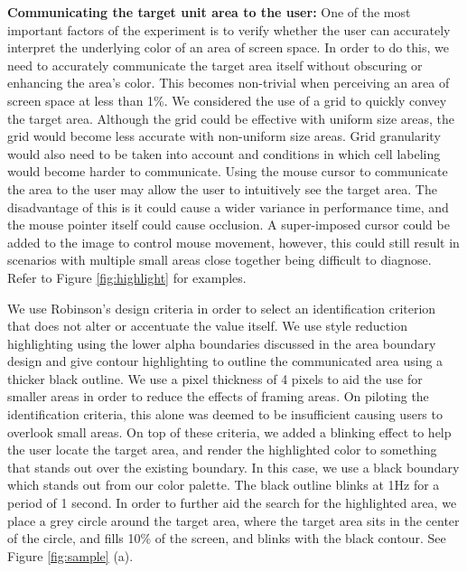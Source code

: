 \textbf{Communicating the target unit area to the user: } One of the most important factors of the experiment is to verify whether the user can accurately interpret the underlying color of an area of screen space. In order to do this, we need to accurately communicate the target area itself without obscuring or enhancing the area's color. This becomes non-trivial when perceiving an area of screen space at less than 1\%. We considered the use of a grid to quickly convey the target area. Although the grid could be effective with uniform size areas, the grid would become less accurate with non-uniform size areas. Grid granularity would also need to be taken into account and conditions in which cell labeling would become harder to communicate.
Using the mouse cursor to communicate the area to the user may allow the user to intuitively see the target area. The disadvantage of this is it could cause a wider variance in performance time, and the mouse pointer itself could cause occlusion. A super-imposed cursor could be added to the image to control mouse movement, however, this could still result in scenarios with multiple small areas close together being difficult to diagnose. Refer to Figure \ref{fig:highlight} for examples.

 We use Robinson's design criteria \cite{robinson2011highlighting} in order to select an identification criterion that does not alter or accentuate the value itself. We use style reduction highlighting using the lower alpha boundaries discussed in the area boundary design and give contour highlighting to outline the communicated area using a thicker black outline. We use a pixel thickness of 4 pixels to aid the use for smaller areas in order to reduce the effects of framing areas.
  On piloting the identification criteria, this alone was deemed to be insufficient causing users to overlook small areas. On top of these criteria, we added a blinking effect to help the user locate the target area, and render the highlighted color to something that stands out over the existing boundary. In this case, we use a black boundary which stands out from our color palette. The black outline blinks at 1Hz for a period of 1 second. In order to further aid the search for the highlighted area, we place a grey circle around the target area, where the target area sits in the center of the circle, and fills 10\% of the screen, and blinks with the black contour. See Figure \ref{fig:sample} (a). 


